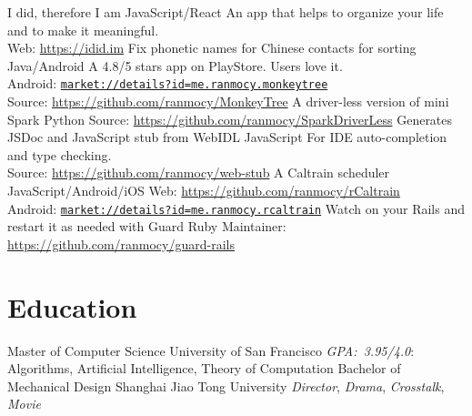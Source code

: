 \documentclass[]{friggeri-cv} %
\begin{document}
\begin{entrylist}
  {I did, therefore I am}
  {JavaScript/React}
  {
    An app that helps to organize your life and to make it meaningful.\\
    Web: \url{https://idid.im}
  }
  {Fix phonetic names for Chinese contacts for sorting}
  {Java/Android}
  {
    A 4.8/5 stars app on PlayStore. Users love it.\\
    Android: \href{https://play.google.com/store/apps/details?id=me.ranmocy.monkeytree}{\texttt{market://details?id=me.ranmocy.monkeytree}}\\
    Source: \url{https://github.com/ranmocy/MonkeyTree}
  }
  {A driver-less version of mini Spark}
  {Python}
  {
    Source: \url{https://github.com/ranmocy/SparkDriverLess}
  }
  {Generates JSDoc and JavaScript stub from WebIDL}
  {JavaScript}
  {
    For IDE auto-completion and type checking.\\
    Source: \url{https://github.com/ranmocy/web-stub}
  }
  {A Caltrain scheduler}
  {JavaScript/Android/iOS}
  {
    Web: \url{https://github.com/ranmocy/rCaltrain}\\
    Android: \href{https://play.google.com/store/apps/details?id=me.ranmocy.rcaltrain}{\texttt{market://details?id=me.ranmocy.rcaltrain}}
  }
  {Watch on your Rails and restart it as needed with Guard}
  {Ruby}
  {
    Maintainer: \url{https://github.com/ranmocy/guard-rails}
  }
\end{entrylist}


\section{Education}

\begin{entrylist}
  {Master \textnormal{of Computer Science}}
  {University of San Francisco}
  {
    \emph{GPA:~3.95/4.0}: Algorithms, Artificial Intelligence, Theory of Computation
  }
  {Bachelor \textnormal{of Mechanical Design}}
  {Shanghai Jiao Tong University}
  {
    \emph{Director}, \emph{Drama}, \emph{Crosstalk}, \emph{Movie}
  }
\end{entrylist}
\end{document}
